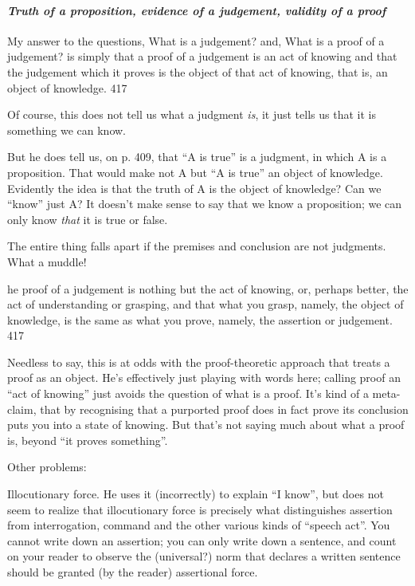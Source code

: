 \paragraph{\textit{Truth of a proposition, evidence of a judgement, validity of a proof}}

\begin{displayquote}
  My answer to the questions, What is a judgement? and, What is a proof of a judgement? is simply that a proof of a judgement is an act of knowing and that the judgement which it proves is the object of that act of knowing, that is, an object of knowledge.
  \parencite{martin1987truth} 417
\end{displayquote}

Of course, this does not tell us what a judgment \textit{is}, it just
tells us that it is something we can know.

But he does tell us, on p. 409, that ``A is true'' is a judgment, in
which A is a proposition. That would make not A but ``A is true'' an
object of knowledge. Evidently the idea is that the truth of A is the
object of knowledge? Can we ``know'' just A? It doesn't make sense to
say that we know a proposition; we can only know \textit{that} it is
true or false.

The entire thing falls apart if the premises and conclusion are not
judgments. What a muddle!

\begin{displayquote}
  [T]he proof of a judgement is nothing but the act of knowing, or,
  perhaps better, the act of understanding or grasping, and that what
  you grasp, namely, the object of knowledge, is the same as what you
  prove, namely, the assertion or judgement. \parencite{martin1987truth}
  417
\end{displayquote}

Needless to say, this is at odds with the proof-theoretic approach
that treats a proof as an object. He's effectively just playing with
words here; calling proof an ``act of knowing'' just avoids the
question of what is a proof. It's kind of a meta-claim, that by
recognising that a purported proof does in fact prove its conclusion
puts you into a state of knowing. But that's not saying much about
what a proof is, beyond ``it proves something''.

\medskip

Other problems:

Illocutionary force. He uses it (incorrectly) to explain ``I know'',
but does not seem to realize that illocutionary force is precisely
what distinguishes assertion from interrogation, command and the other
various kinds of ``speech act''. You cannot write down an assertion;
you can only write down a sentence, and count on your reader to
observe the (universal?) norm that declares a written sentence should
be granted (by the reader) assertional force.

